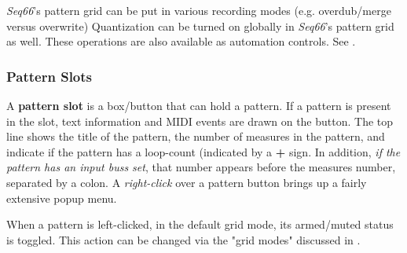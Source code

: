   \textsl{Seq66}'s pattern grid can be put in various recording
   modes (e.g. overdub/merge versus overwrite)
   Quantization can be turned on globally in \textsl{Seq66}'s pattern grid
   as well.
   These operations are also available as automation controls.
   See .

\subsubsection{Pattern Slots}
\label{subsubsec:patterns_pattern_slot}

   A \textbf{pattern slot} is a box/button that can hold a pattern.
   If a pattern is present in the slot, text information and MIDI
   events are drawn on the button.
   The top line shows
   the title of the pattern, the number of measures in the pattern, and
   indicate if the pattern has a loop-count (indicated by a \textbf{+} sign.
   In addition, \textsl{if the pattern has an input buss set}, that number
   appears before the measures number, separated by a colon.
   A \textsl{right-click} over a pattern button brings up a fairly extensive
   popup menu.

   When a pattern is left-clicked, in the default grid mode,
   its armed/muted status is toggled.
   This action can be changed via the "grid modes" discussed in
   .

%

